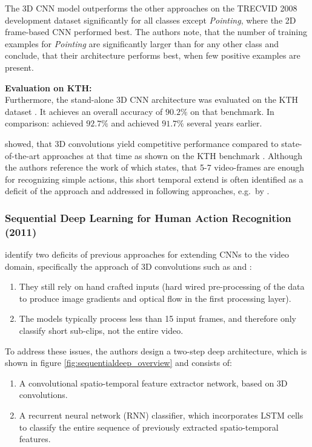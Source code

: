 The 3D CNN model outperforms the other approaches on the TRECVID 2008 development dataset significantly for all classes except \textit{Pointing}, where the 2D frame-based CNN performed best.
The authors note, that the number of training examples for \textit{Pointing} are significantly larger than for any other class and conclude, that their architecture performs best, when few positive examples are present.

\textbf{Evaluation on KTH:}\\
Furthermore, the stand-alone 3D CNN architecture was evaluated on the KTH dataset \cite{schuldt_recognizing_2004}.
It achieves an overall accuracy of $90.2\%$ on that benchmark.
In comparison: \textcite{schindler_action_2008} achieved $92.7\%$ and \textcite{jhuang_biologically_2007} achieved $91.7\%$ several years earlier.

\textcite{ji_3d_2013} showed, that 3D convolutions yield competitive performance compared to state-of-the-art approaches at that time as shown on the KTH benchmark \cite{schuldt_recognizing_2004}.
Although the authors reference the work of \textcite{schindler_action_2008} which states, that 5-7 video-frames are enough for recognizing simple actions, this short temporal extend is often identified as a deficit of the approach and addressed in following approaches, e.g.\ by \textcite{baccouche_sequential_2011}.


\subsubsection{Sequential Deep Learning for Human Action Recognition (2011)}
\textcite{baccouche_sequential_2011} identify two deficits of previous approaches for extending CNNs to the video domain, specifically the approach of 3D convolutions such as \cite{ji_3d_2013} and \cite{kim_human_2007}:
\begin{enumerate}
    \item They still rely on hand crafted inputs (hard wired pre-processing of the data to produce image gradients and optical flow in the first processing layer).
    \item The models typically process less than 15 input frames, and therefore only classify short sub-clips, not the entire video.
\end{enumerate}

To address these issues, the authors design a two-step deep architecture, which is shown in figure \ref{fig:sequentialdeep_overview} and consists of:
\begin{enumerate}
    \item A convolutional spatio-temporal feature extractor network, based on 3D convolutions.
    \item A recurrent neural network (RNN) classifier, which incorporates LSTM cells \cite{hochreiter_long_1997} to classify the entire sequence of previously extracted spatio-temporal features.
\end{enumerate}

